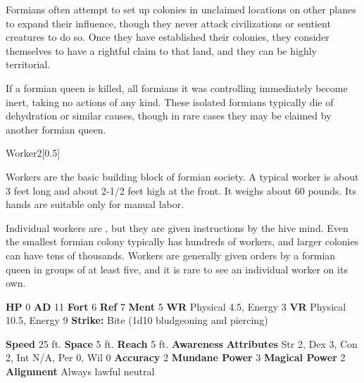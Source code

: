       Formians often attempt to set up colonies in unclaimed locations on other planes to expand their influence, though they never attack civilizations or sentient creatures to do so.
      Once they have established their colonies, they consider themselves to have a rightful claim to that land, and they can be highly territorial.

      If a formian queen is killed, all formians it was controlling immediately become inert, taking no actions of any kind.
      These isolated formians typically die of dehydration or similar causes, though in rare cases they may be claimed by another formian queen.
    

      
  \begin{monsubsection}{Worker}{2}[0.5]
    \vspace{-1em}\vspace{-1em}
    \vspace{0em}

    
          Workers are the basic building block of formian society.
          A typical worker is about 3 feet long and about 2-1/2 feet high at the front.
          It weighs about 60 pounds.
          Its hands are suitable only for manual labor.
        
          Individual workers are , but they are given instructions by the hive mind.
          Even the smallest formian colony typically has hundreds of workers, and larger colonies can have tens of thousands.
          Workers are generally given orders by a formian queen in groups of at least five, and it is rare to see an individual worker on its own.
        

    \begin{spellcontent}
      \begin{spelltargetinginfo}
        \pari \textbf{HP} 0 \monsep
          \textbf{AD} 11 \monsep
          \textbf{Fort} 6 \monsep
          \textbf{Ref} 7 \monsep
          \textbf{Ment} 5
        \pari \textbf{WR} Physical 4.5, Energy 3 \monsep
        \textbf{VR} Physical 10.5, Energy 9
        \pari \textbf{Strike:}
            Bite  (1d10 bludgeoning and piercing)
      \end{spelltargetinginfo}
    \end{spellcontent}
    \begin{monsterfooter}
      \pari \textbf{Speed} 25 ft. \monsep
        \textbf{Space} 5 ft. \monsep
        \textbf{Reach} 5 ft.
      \pari \textbf{Awareness} 
      \pari \textbf{Attributes}
        Str 2, Dex 3,
        Con 2, Int N/A,
        Per 0, Wil 0
      \pari \textbf{Accuracy} 2 \monsep
        \textbf{Mundane Power} 3 \monsep
      \textbf{Magical Power} 2
      \pari \textbf{Alignment} Always lawful neutral
    \end{monsterfooter}
  \end{monsubsection}
